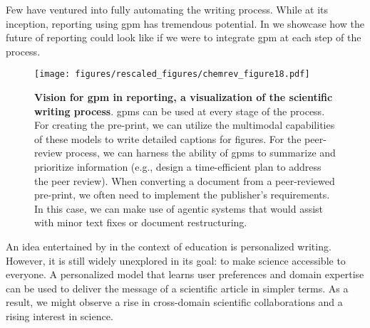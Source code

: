 Few have ventured into fully automating the writing process.\autocite{yamada2025ai} 
While at its inception, reporting using \gls{gpm} has tremendous potential. 
In  we showcase how the future of reporting could look like if we were to integrate \gls{gpm} at each step of the process.

\begin{figure}[!ht]
    \centering
        \texttt{[image: figures/rescaled\_figures/chemrev\_figure18.pdf]}
    \caption{\textbf{Vision for \gls{gpm} in reporting, a visualization of the scientific writing process}. \glspl{gpm} can be used at every stage of the process. For creating the pre-print, we can utilize the multimodal capabilities of these models to write detailed captions for figures. For the peer-review process, we can harness the ability of \glspl{gpm} to summarize and prioritize information (e.g., design a time-efficient plan to address the peer review). When converting a document from a peer-reviewed pre-print, we often need to implement the publisher's requirements. In this case, we can make use of agentic systems that would assist with minor text fixes or document restructuring.}
    \label{fig:writing_with_ml}
\end{figure}

An idea entertained by \textcite{li2023teach} in the context of education is personalized writing. 
However, it is still widely unexplored in its goal: to make science accessible to everyone. 
A personalized model that learns user preferences and domain expertise can be used to deliver the message of a scientific article in simpler terms. 
As a result, we might observe a rise in cross-domain scientific collaborations and a rising interest in science.